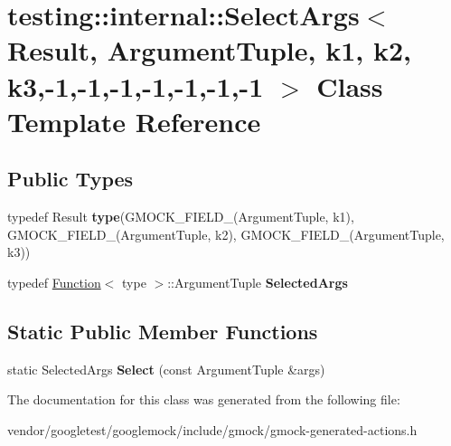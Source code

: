\hypertarget{classtesting_1_1internal_1_1SelectArgs_3_01Result_00_01ArgumentTuple_00_01k1_00_01k2_00_01k3_00-ec796500c928719576d12fb062fb620e}{}\section{testing\+:\+:internal\+:\+:Select\+Args$<$ Result, Argument\+Tuple, k1, k2, k3,-\/1,-\/1,-\/1,-\/1,-\/1,-\/1,-\/1 $>$ Class Template Reference}
\label{classtesting_1_1internal_1_1SelectArgs_3_01Result_00_01ArgumentTuple_00_01k1_00_01k2_00_01k3_00-ec796500c928719576d12fb062fb620e}
\subsection*{Public Types}
\begin{DoxyCompactItemize}
\item 
typedef Result {\bfseries type}(G\+M\+O\+C\+K\+\_\+\+F\+I\+E\+L\+D\+\_\+(Argument\+Tuple, k1), G\+M\+O\+C\+K\+\_\+\+F\+I\+E\+L\+D\+\_\+(Argument\+Tuple, k2), G\+M\+O\+C\+K\+\_\+\+F\+I\+E\+L\+D\+\_\+(Argument\+Tuple, k3))\hypertarget{classtesting_1_1internal_1_1SelectArgs_3_01Result_00_01ArgumentTuple_00_01k1_00_01k2_00_01k3_00-ec796500c928719576d12fb062fb620e_a119de974a2cbe11218028beb465aa012}{}\label{classtesting_1_1internal_1_1SelectArgs_3_01Result_00_01ArgumentTuple_00_01k1_00_01k2_00_01k3_00-ec796500c928719576d12fb062fb620e_a119de974a2cbe11218028beb465aa012}

\item 
typedef \hyperlink{structtesting_1_1internal_1_1Function}{Function}$<$ type $>$\+::Argument\+Tuple {\bfseries Selected\+Args}\hypertarget{classtesting_1_1internal_1_1SelectArgs_3_01Result_00_01ArgumentTuple_00_01k1_00_01k2_00_01k3_00-ec796500c928719576d12fb062fb620e_a3c328563b5d89854bf85a03004fd2f88}{}\label{classtesting_1_1internal_1_1SelectArgs_3_01Result_00_01ArgumentTuple_00_01k1_00_01k2_00_01k3_00-ec796500c928719576d12fb062fb620e_a3c328563b5d89854bf85a03004fd2f88}

\end{DoxyCompactItemize}
\subsection*{Static Public Member Functions}
\begin{DoxyCompactItemize}
\item 
static Selected\+Args {\bfseries Select} (const Argument\+Tuple \&args)\hypertarget{classtesting_1_1internal_1_1SelectArgs_3_01Result_00_01ArgumentTuple_00_01k1_00_01k2_00_01k3_00-ec796500c928719576d12fb062fb620e_a80d2e8ee92217dfa3eb4154604a66815}{}\label{classtesting_1_1internal_1_1SelectArgs_3_01Result_00_01ArgumentTuple_00_01k1_00_01k2_00_01k3_00-ec796500c928719576d12fb062fb620e_a80d2e8ee92217dfa3eb4154604a66815}

\end{DoxyCompactItemize}


The documentation for this class was generated from the following file\+:\begin{DoxyCompactItemize}
\item 
vendor/googletest/googlemock/include/gmock/gmock-\/generated-\/actions.\+h\end{DoxyCompactItemize}

